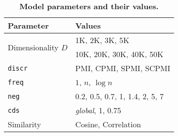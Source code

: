 \begin{table}
  \centering
  \small
  \begin{tabular}{ll}
    \toprule
    Parameter & Values \\
    \midrule
    \multirow{2}{*}{Dimensionality $D$} & 1K, 2K, 3K, 5K \\
                                    & 10K, 20K, 30K, 40K, 50K \\
    \texttt{discr} & PMI, CPMI, SPMI, SCPMI \\
    \texttt{freq} & $1$, $n$, $\log n$ \\
    \texttt{neg} & 0.2, 0.5, 0.7, 1, 1.4, 2, 5, 7 \\
    \texttt{cds} & \textit{global}, 1, 0.75 \\
    Similarity & Cosine, Correlation \\
    \bottomrule
  \end{tabular}
  \caption{\textbf{Model parameters and their values.}}
\label{tab:parameters}
\end{table}

